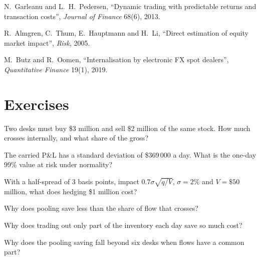 \begin{omsources}
\item N.~Garleanu and L.~H.~Pedersen, ``Dynamic trading with predictable returns and transaction costs'', \emph{Journal of Finance} 68(6), 2013.
\item R.~Almgren, C.~Thum, E.~Hauptmann and H.~Li, ``Direct estimation of equity market impact'', \emph{Risk}, 2005.
\item M.~Butz and R.~Oomen, ``Internalisation by electronic FX spot dealers'', \emph{Quantitative Finance} 19(1), 2019.
\end{omsources}

\section{Exercises}

\begin{exercise}[$\star$]\label{exo:s2:the-central-risk-book:1}
Two desks must buy \$3 million and sell \$2 million of the same stock. How much crosses internally, and what share of the gross?
\end{exercise}

\begin{exercise}[$\star$]\label{exo:s2:the-central-risk-book:2}
The carried P\&L has a standard deviation of \$369\,000 a day. What is the one-day 99\% value at risk under normality?
\end{exercise}

\begin{exercise}[$\star$]\label{exo:s2:the-central-risk-book:3}
With a half-spread of 3 basis points, impact $0.7\sigma\sqrt{q/V}$, $\sigma = 2\%$ and $V = \$50$ million, what does hedging \$1 million cost?
\end{exercise}

\begin{exercise}[$\star\star$]\label{exo:s2:the-central-risk-book:4}
Why does pooling save less than the share of flow that crosses?
\end{exercise}

\begin{exercise}[$\star\star$]\label{exo:s2:the-central-risk-book:5}
Why does trading out only part of the inventory each day save so much cost?
\end{exercise}

\begin{exercise}[$\star\star$]\label{exo:s2:the-central-risk-book:6}
Why does the pooling saving fall beyond six desks when flows have a common part?
\end{exercise}

